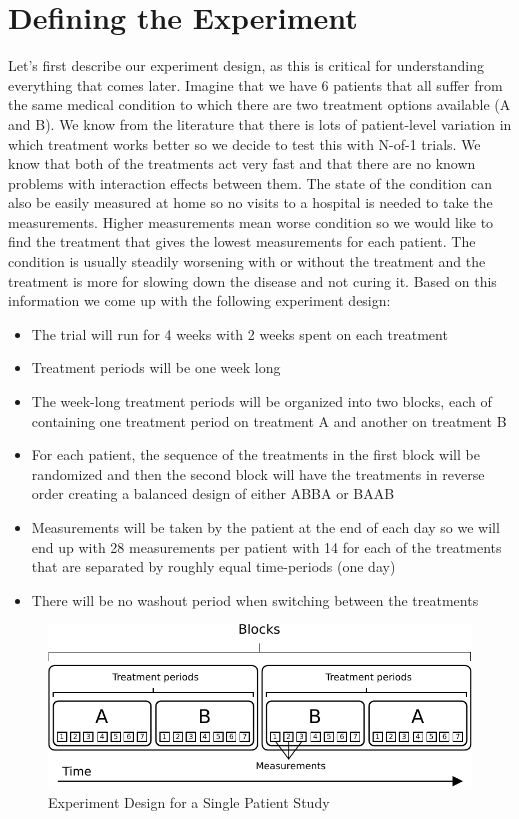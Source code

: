 \documentclass[12pt,a4paper,leqno]{report}
\theoremstyle{plain}
\theoremstyle{definition}
\theoremstyle{remark}
\begin{document}
\section{Defining the Experiment}

Let's first describe our experiment design, as this is critical for understanding
everything that comes later. Imagine that we have 6 patients that all suffer from the
same medical condition to which there are two treatment options available (A and
B). We know from the
literature that there is lots of patient-level variation in which treatment works better
so we decide to test this with N-of-1 trials. We know that both of the treatments act
very fast and that there are no known problems with interaction effects between them.
The state of the condition can also be easily measured at home so no visits to
a hospital is needed to take the measurements. Higher measurements mean worse condition
so we would like to find the treatment that gives the lowest measurements for each
patient. The condition is usually steadily
worsening with or without the treatment and the treatment is more for slowing down the
disease and not curing it. Based on this information we come up with the following experiment design:

\begin{itemize}
    \item The trial will run for 4 weeks with 2 weeks spent on each treatment
    \item Treatment periods will be one week long
    \item The week-long treatment periods will be organized into two blocks, each of
    containing one treatment period on treatment A and another on treatment B
    \item For each patient, the sequence of the treatments in the first block will be randomized and then
    the second block will have the treatments in reverse order creating a balanced
    design of either ABBA or BAAB
    \item Measurements will be taken by the patient at the end of each day so we will end up with
    28 measurements per patient with 14 for each of the treatments that are separated by
    roughly equal time-periods (one day)
    \item There will be no washout period when switching between the treatments
\end{itemize}

\begin{figure}[H]
    \centering
    \caption{Experiment Design for a Single Patient Study}\label{singlepatientexperimentdesign}
    \bigskip
    \includegraphics{design_for_simulated_experiment.pdf}
\end{figure}
\end{document}
